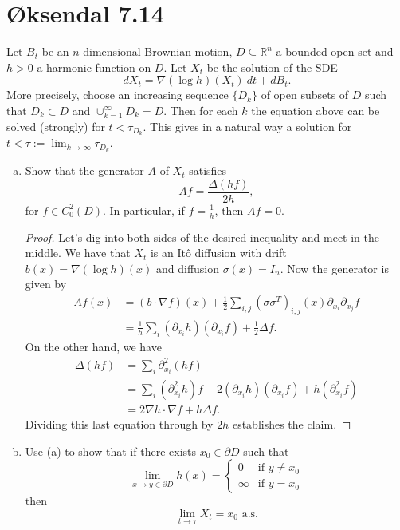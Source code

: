 \documentclass[11pt,letterpaper]{report}
\newcommand{\reals}{\mathbb{R}}
\theoremstyle{definition}
\begin{document}
\section*{\O ksendal 7.14}
Let $B_t$ be an $n$-dimensional Brownian motion, $D\subseteq \reals^n$ a bounded open set and $h>0$ a harmonic function on $D$. Let $X_t$ be the solution of the SDE
\[
dX_t = \nabla (\log h)(X_t)\ dt+dB_t.
\]
More precisely, choose an increasing sequence $\{D_k\}$ of open subsets of $D$ such that $\overline{D}_k\subset D$ and $\cup_{k=1}^\infty D_k = D$. Then for each $k$ the equation above can be solved (strongly) for $t<\tau_{D_k}$. This gives in a natural way a solution for $t<\tau := \lim_{k\to \infty}\tau_{D_k}$.
\begin{enumerate}[(a)]
	\item Show that the generator $A$ of $X_t$ satisfies
	\[
	Af= \frac{\Delta (hf)}{2h},
	\]
	for $f\in C_0^2(D)$. In particular, if $f= \frac{1}{h}$, then $Af = 0$.
	\begin{proof}
		Let's dig into both sides of the desired inequality and meet in the middle. We have that $X_t$ is an It\^o diffusion with drift $b(x) = \nabla(\log h)(x)$ and diffusion $\sigma(x) = I_n$. Now the generator is given by
		\begin{align*}
			Af(x) &= (b\cdot \nabla f)(x) + \frac{1}{2}\sum_{i,j}(\sigma\sigma^T)_{i,j}(x)\partial_{x_i}\partial_{x_j}f\\
			&= \frac{1}{h}\sum_i(\partial_{x_i}h)(\partial_{x_i}f) + \frac{1}{2}\Delta f.
		\end{align*}
		On the other hand, we have
		\begin{align*}
			\Delta(hf) &= \sum_i\partial^2_{x_i}(hf)\\
			&= \sum_i(\partial^2_{x_i}h)f + 2(\partial_{x_i}h)(\partial_{x_i}f) + h(\partial^2_{x_i}f)\\
			&= 2 \nabla h\cdot \nabla f + h\Delta f.
		\end{align*}
		Dividing this last equation through by $2h$ establishes the claim.
	\end{proof}

	\item Use (a) to show that if there exists $x_0\in \partial D$ such that
	\[
	\lim_{x\to y\in \partial D}h(x) = \begin{cases}
		0&\text{if }y\neq x_0\\
		\infty&\text{if }y = x_0
	\end{cases}
	\]
	then
	\[
	\lim_{t\to \tau}X_t = x_0\text{ a.s.}
	\]
\end{enumerate}
\end{document}
